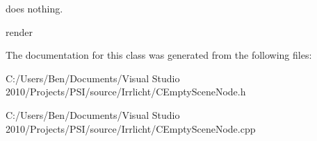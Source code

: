does nothing. 

render 

The documentation for this class was generated from the following files\-:\begin{DoxyCompactItemize}
\item 
C\-:/\-Users/\-Ben/\-Documents/\-Visual Studio 2010/\-Projects/\-P\-S\-I/source/\-Irrlicht/C\-Empty\-Scene\-Node.\-h\item 
C\-:/\-Users/\-Ben/\-Documents/\-Visual Studio 2010/\-Projects/\-P\-S\-I/source/\-Irrlicht/C\-Empty\-Scene\-Node.\-cpp\end{DoxyCompactItemize}
